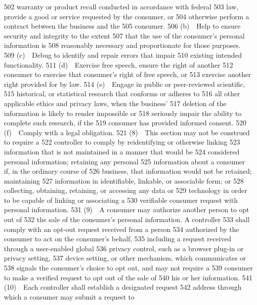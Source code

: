   502  warranty or product recall conducted in accordance with federal
  503  law, provide a good or service requested by the consumer, or
  504  otherwise perform a contract between the business and the
  505  consumer.
  506         (b) Help to ensure security and integrity to the extent
  507  that the use of the consumer’s personal information is
  508  reasonably necessary and proportionate for those purposes.
  509         (c) Debug to identify and repair errors that impair
  510  existing intended functionality.
  511         (d) Exercise free speech, ensure the right of another
  512  consumer to exercise that consumer’s right of free speech, or
  513  exercise another right provided for by law.
  514         (e) Engage in public or peer-reviewed scientific,
  515  historical, or statistical research that conforms or adheres to
  516  all other applicable ethics and privacy laws, when the business’
  517  deletion of the information is likely to render impossible or
  518  seriously impair the ability to complete such research, if the
  519  consumer has provided informed consent.
  520         (f) Comply with a legal obligation.
  521         (8) This section may not be construed to require a
  522  controller to comply by reidentifying or otherwise linking
  523  information that is not maintained in a manner that would be
  524  considered personal information; retaining any personal
  525  information about a consumer if, in the ordinary course of
  526  business, that information would not be retained; maintaining
  527  information in identifiable, linkable, or associable form; or
  528  collecting, obtaining, retaining, or accessing any data or
  529  technology in order to be capable of linking or associating a
  530  verifiable consumer request with personal information.
  531         (9) A consumer may authorize another person to opt out of
  532  the sale of the consumer’s personal information. A controller
  533  shall comply with an opt-out request received from a person
  534  authorized by the consumer to act on the consumer’s behalf,
  535  including a request received through a user-enabled global
  536  privacy control, such as a browser plug-in or privacy setting,
  537  device setting, or other mechanism, which communicates or
  538  signals the consumer’s choice to opt out, and may not require a
  539  consumer to make a verified request to opt out of the sale of
  540  his or her information.
  541         (10) Each controller shall establish a designated request
  542  address through which a consumer may submit a request to
